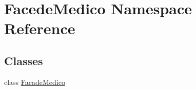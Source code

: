 \hypertarget{namespace_facede_medico}{}\section{Facede\+Medico Namespace Reference}
\label{namespace_facede_medico}
\subsection*{Classes}
\begin{DoxyCompactItemize}
\item 
class \mbox{\hyperlink{class_facede_medico_1_1_facade_medico}{Facade\+Medico}}
\end{DoxyCompactItemize}
